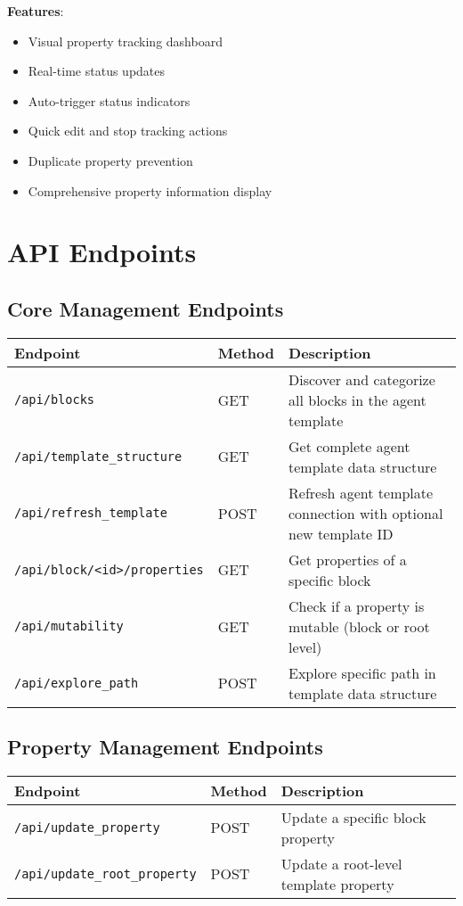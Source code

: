 \documentclass[12pt,a4paper]{article}
\begin{document}
\textbf{Features}:
\begin{itemize}
    \item Visual property tracking dashboard
    \item Real-time status updates
    \item Auto-trigger status indicators
    \item Quick edit and stop tracking actions
    \item Duplicate property prevention
    \item Comprehensive property information display
\end{itemize}

\section{API Endpoints}

\subsection{Core Management Endpoints}

\begin{longtable}{|p{3cm}|p{2cm}|p{8cm}|}
\hline
\textbf{Endpoint} & \textbf{Method} & \textbf{Description} \\
\hline
\endhead
\hline
\endfoot
\texttt{/api/blocks} & GET & Discover and categorize all blocks in the agent template \\
\texttt{/api/template\_structure} & GET & Get complete agent template data structure \\
\texttt{/api/refresh\_template} & POST & Refresh agent template connection with optional new template ID \\
\texttt{/api/block/<id>/properties} & GET & Get properties of a specific block \\
\texttt{/api/mutability} & GET & Check if a property is mutable (block or root level) \\
\texttt{/api/explore\_path} & POST & Explore specific path in template data structure \\
\hline
\end{longtable}

\subsection{Property Management Endpoints}

\begin{longtable}{|p{3cm}|p{2cm}|p{8cm}|}
\hline
\textbf{Endpoint} & \textbf{Method} & \textbf{Description} \\
\hline
\endhead
\hline
\endfoot
\texttt{/api/update\_property} & POST & Update a specific block property \\
\texttt{/api/update\_root\_property} & POST & Update a root-level template property \\
\hline
\end{longtable}
\end{document}
